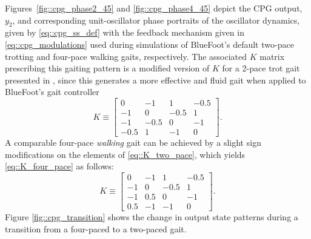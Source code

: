 			Figures~\ref{fig::cpg_phase2_45} and \ref{fig::cpg_phase4_45} depict the CPG output, $y_{2}$, and corresponding unit-oscillator phase portraits of the oscillator dynamics, given by \ref{eq::cpg_ss_def} with the feedback mechanism given in \ref{eq::cpg_modulations} used during simulations of BlueFoot's default two-pace trotting and four-pace walking gaits, respectively. The associated $K$ matrix prescribing this gaiting pattern is a modified version of $K$ for a 2-pace trot gait presented in \cite{Rutishauser2008}, since this generates a more effective and fluid gait when applied to BlueFoot's gait controller
				\begin{equation}
						K\equiv 
						\left[ 
						\begin{array}{cccc}
						 0	   	&	-1   	&	 	 1   	&		-0.5\\
						-1	   	&	 0   	&	 	-0.5   	&		 1 	\\
						-1    	&	-0.5   	&		0    	&	 	-1 	\\
						-0.5	&	 1   	&		-1    	&		 0
						\end{array}
						\right].
						\label{eq::K_two_pace}
				\end{equation}
			A comparable four-pace \emph{walking} gait can be achieved by a slight sign modifications on the elements of  \ref{eq::K_two_pace}, which yields \ref{eq::K_four_pace} as follows:
				\begin{equation}
						K\equiv 
						\left[ 
						\begin{array}{cccc}
						 0	   	&	-1   	&	 	 1   	&	  	-0.5\\
						-1	   	&	 0   	&	 	-0.5   	&		 1 	\\
						-1    	&	 0.5   	&		 0    	&	 	-1 	\\
						 0.5	&	-1   	&		-1    	&		 0
						\end{array}
						\right].
						\label{eq::K_four_pace}
				\end{equation}
Figure \ref{fig::cpg_transition} shows the change in output state patterns during a transition from a four-paced to a two-paced gait.	%

